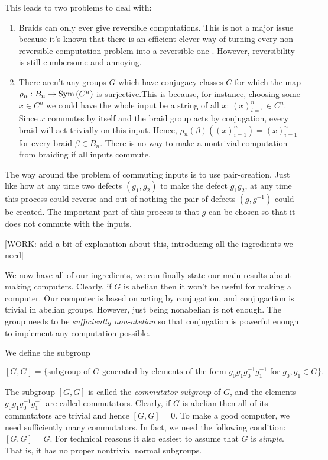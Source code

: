 This leads to two problems to deal with:

\begin{enumerate}
\item Braids can only ever give reversible computations. This is not a major issue because it's known that there is an efficient clever way of turning every non-reversible computation problem into a reversible one \cite{bennett1973logical}. However, reversibility is still cumbersome and annoying.

\item There aren't any groups $G$ which have conjugacy classes $C$ for which the map $\rho_n: B_n \to \operatorname{Sym}\left(C^n\right)$ is surjective.This is because, for instance, choosing some $x\in C^n$ we could have the whole input be a string of all $x$: $(x)_{i=1}^n\in C^n$. Since $x$ commutes by itself and the braid group acts by conjugation, every braid will act trivially on this input. Hence, $\rho_n(\beta)\left((x)_{i=1}^n\right)=(x)_{i=1}^n$ for every braid $\beta\in B_n$. There is no way to make a nontrivial computation from braiding if all inputs commute. 

\end{enumerate}

The way around the problem of commuting inputs is to use pair-creation. Just like how at any time two defects $(g_1,g_2)$ to make the defect $g_1g_2$, at any time this process could reverse and out of nothing the pair of defects $(g,g^{-1})$ could be created. The important part of this process is that $g$ can be chosen so that it does not commute with the inputs.

[WORK: add a bit of explanation about this, introducing all the ingredients we need]

We now have all of our ingredients, we can finally state our main results about making computers. Clearly, if $G$ is abelian then it won't be useful for making a computer. Our computer is based on acting by conjugation, and conjugaction is trivial in abelian groups. However, just being nonabelian is not enough. The group needs to be \textit{sufficiently non-abelian} so that conjugation is powerful enough to implement any computation possible.

We define the subgroup

$$[G,G]=\{\text{subgroup of $G$ generated by elements of the form }g_{0}g_{1}g_{0}^{-1}g_{1}^{-1}\text{ for }g_0,g_1\in G\}.$$

The subgroup $[G,G]$ is called the \textit{commutator subgroup} of $G$, and the elements $g_{0}g_{1}g_{0}^{-1}g_{1}^{-1}$ are called commutators. Clearly, if $G$ is abelian then all of its commutators are trivial and hence $[G,G]=0$. To make a good computer, we need sufficiently many commutators. In fact, we need the following condition: $[G,G]=G$. For technical reasons it also easiest to assume that $G$ is \textit{simple}. That is, it has no proper nontrivial normal subgroups.


